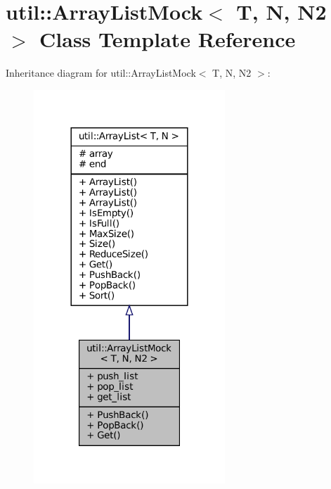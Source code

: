 \hypertarget{classutil_1_1ArrayListMock}{}\section{util\+:\+:Array\+List\+Mock$<$ T, N, N2 $>$ Class Template Reference}
\label{classutil_1_1ArrayListMock}


Inheritance diagram for util\+:\+:Array\+List\+Mock$<$ T, N, N2 $>$\+:
\nopagebreak
\begin{figure}[H]
\begin{center}
\leavevmode
\includegraphics[width=204pt]{classutil_1_1ArrayListMock__inherit__graph}
\end{center}
\end{figure}


